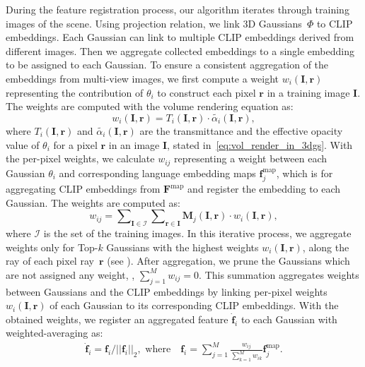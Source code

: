 During the feature registration process, our algorithm iterates through training images of the scene. Using projection relation, we link 3D Gaussians~$\Phi$ to CLIP embeddings. Each Gaussian can link to multiple CLIP embeddings derived from different images. Then we aggregate collected embeddings to a single embedding to be assigned to each Gaussian.
To ensure a consistent aggregation of the embeddings from multi-view images, we first compute a weight $w_i(\mathbf{I}, \mathbf{r})$ representing the contribution of $\theta_i$ to construct each pixel $\mathbf{r}$ in a training image $\mathbf{I}$.
The weights are computed with the volume rendering equation  as:
\begin{equation}
    w_i(\mathbf{I}, \mathbf{r}) = T_i(\mathbf{I}, \mathbf{r})\cdot\tilde{\alpha_i}(\mathbf{I}, \mathbf{r}),
    \label{eq:weight definition}
\end{equation}
where $T_i(\mathbf{I}, \mathbf{r})$ and $\tilde{\alpha_i}(\mathbf{I}, \mathbf{r})$ are the transmittance and the effective opacity value of $\theta_i$ for a pixel $\mathbf{r}$ in an image $\mathbf{I}$, stated in~\cref{eq:vol_render_in_3dgs}. With the per-pixel weights, we calculate $w_{ij}$ representing a weight between each Gaussian $\theta_i$ and corresponding language embedding maps $\mathbf{f}_j^\text{map}$, which is for aggregating CLIP embeddings from $\mathbf{F}^\text{map}$ and register the embedding to each Gaussian. The weights are computed as:
\begin{equation}
    w_{ij} = \sum\nolimits_{\mathbf{I}\in \mathcal{I}}\sum\nolimits_{\mathbf{r} \in \mathbf{I}} \mathbf{M}_j(\mathbf{I},\mathbf{r})\cdot w_i(\mathbf{I},\mathbf{r}),
\end{equation}
where $\mathcal{I}$ is the set of the training images. In this iterative process, we aggregate weights only for Top-$k$ Gaussians with the highest weights $w_i(\mathbf{I}, \mathbf{r})$, along the ray of each pixel ray~$\mathbf{r}$ (see ). After aggregation, we prune the Gaussians which are not assigned any weight, \ie, $\sum_{j=1}^M w_{ij}=0$.
This summation aggregates weights between Gaussians and the CLIP embeddings by linking per-pixel weights $w_i(\mathbf{I},\mathbf{r})$ of each Gaussian to its corresponding CLIP embeddings. 
With the obtained weights, we register an aggregated feature $\dot{\mathbf{f}}_i$ to each Gaussian with weighted-averaging as:
\begin{equation}
    \label{eq:weighted-averaging}
    \begin{gathered}
            \dot{\mathbf{f}}_i = \mathbf{f}_i / ||\mathbf{f}_i||_2, \,\, \textrm{where}\quad \mathbf{f}_i = \sum\nolimits_{j=1}^{M} \tfrac{w_{ij}}{\sum^M_{k=1} w_{ik}} \mathbf{f}^\text{map}_j.
    \end{gathered}
\end{equation}
